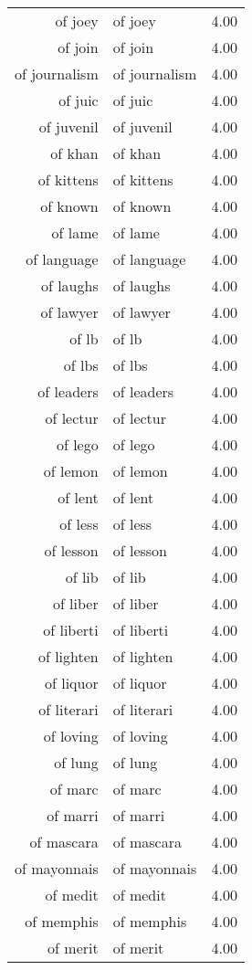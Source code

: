 \begin{table}[ht]
\begin{tabular}{rlr}
  of joey & of joey & 4.00 \\ 
  of join & of join & 4.00 \\ 
  of journalism & of journalism & 4.00 \\ 
  of juic & of juic & 4.00 \\ 
  of juvenil & of juvenil & 4.00 \\ 
  of khan & of khan & 4.00 \\ 
  of kittens & of kittens & 4.00 \\ 
  of known & of known & 4.00 \\ 
  of lame & of lame & 4.00 \\ 
  of language & of language & 4.00 \\ 
  of laughs & of laughs & 4.00 \\ 
  of lawyer & of lawyer & 4.00 \\ 
  of lb & of lb & 4.00 \\ 
  of lbs & of lbs & 4.00 \\ 
  of leaders & of leaders & 4.00 \\ 
  of lectur & of lectur & 4.00 \\ 
  of lego & of lego & 4.00 \\ 
  of lemon & of lemon & 4.00 \\ 
  of lent & of lent & 4.00 \\ 
  of less & of less & 4.00 \\ 
  of lesson & of lesson & 4.00 \\ 
  of lib & of lib & 4.00 \\ 
  of liber & of liber & 4.00 \\ 
  of liberti & of liberti & 4.00 \\ 
  of lighten & of lighten & 4.00 \\ 
  of liquor & of liquor & 4.00 \\ 
  of literari & of literari & 4.00 \\ 
  of loving & of loving & 4.00 \\ 
  of lung & of lung & 4.00 \\ 
  of marc & of marc & 4.00 \\ 
  of marri & of marri & 4.00 \\ 
  of mascara & of mascara & 4.00 \\ 
  of mayonnais & of mayonnais & 4.00 \\ 
  of medit & of medit & 4.00 \\ 
  of memphis & of memphis & 4.00 \\ 
  of merit & of merit & 4.00 \\ 

\end{tabular}
\end{table}
